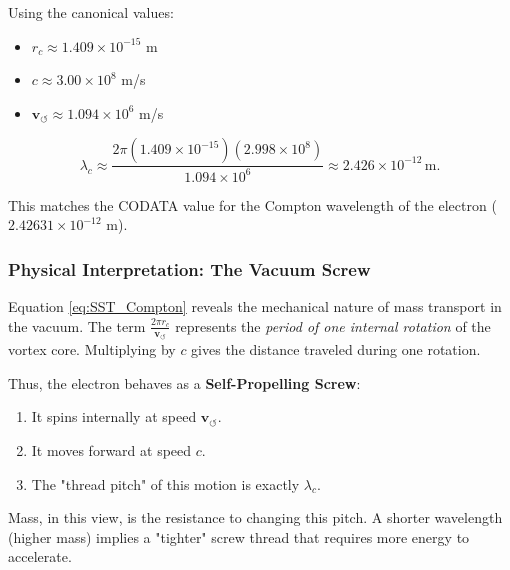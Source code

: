         Using the canonical values:
        \begin{itemize}
            \item $r_c \approx 1.409 \times 10^{-15}$ m
            \item $c \approx 3.00 \times 10^8$ m/s
            \item $\mathbf{v}_{\!\boldsymbol{\circlearrowleft}} \approx 1.094 \times 10^6$ m/s
        \end{itemize}

        \begin{equation}
            \lambda_c \approx \frac{2\pi (1.409 \times 10^{-15})(2.998 \times 10^8)}{1.094 \times 10^6}
            \approx 2.426 \times 10^{-12} \, \text{m}.
        \end{equation}

        This matches the CODATA value for the Compton wavelength of the electron
        ($2.42631 \times 10^{-12}$ m).

    \subsubsection*{Physical Interpretation: The Vacuum Screw}

        Equation \eqref{eq:SST_Compton} reveals the mechanical nature of mass
        transport in the vacuum.
        The term $\frac{2\pi r_c}{\mathbf{v}_{\!\boldsymbol{\circlearrowleft}}}$ represents the \emph{period of one internal rotation}
        of the vortex core. Multiplying by $c$ gives the distance traveled
        during one rotation.

        Thus, the electron behaves as a \textbf{Self-Propelling Screw}:
        \begin{enumerate}
            \item It spins internally at speed $\mathbf{v}_{\!\boldsymbol{\circlearrowleft}}$.
            \item It moves forward at speed $c$.
            \item The "thread pitch" of this motion is exactly $\lambda_c$.
        \end{enumerate}

        Mass, in this view, is the resistance to changing this pitch. A shorter
        wavelength (higher mass) implies a "tighter" screw thread that requires
        more energy to accelerate.

